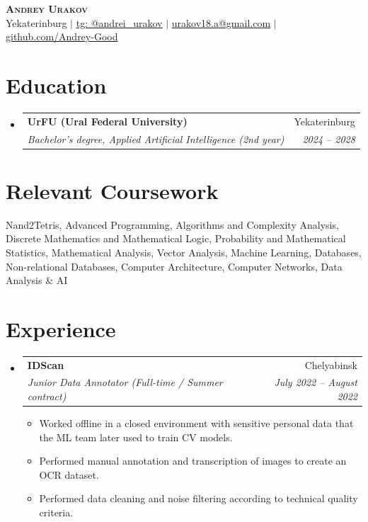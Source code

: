 \documentclass[letterpaper,10pt]{article}
\makeatletter
\newcommand{\resumeItem}[1]{
  \item\small{
    {#1 \vspace{-2pt}}
  }
}
\newcommand{\resumeSubheading}[4]{
  \vspace{-1pt}\item
    \begin{tabular*}{0.97\textwidth}[t]{l@{\extracolsep{\fill}}r}
      \textbf{#1} & #2 \\
      \textit{\small#3} & \textit{\small #4} \\
    \end{tabular*}\vspace{-7pt}
}
\newcommand{\resumeSubHeadingListStart}{\begin{itemize}[leftmargin=0.15in, label={}]}
\newcommand{\resumeSubHeadingListEnd}{\end{itemize}}
\newcommand{\resumeItemListStart}{\begin{itemize}[itemsep=0pt, parsep=0pt, topsep=1pt]}
\newcommand{\resumeItemListEnd}{\end{itemize}\vspace{-5pt}}
\makeatother
\begin{document}
\begin{center}
    \textbf{\Huge \scshape Andrey Urakov} \\ \vspace{1pt}
    \small{}Yekaterinburg $|$ \href{https://t.me/andrei\_urakov}{\underline{tg: @andrei\_urakov}} $|$ \href{mailto:urakov18.a@gmail.com}{\underline{urakov18.a@gmail.com}} $|$ \href{https://github.com/Andrey-Good}{\underline{github.com/Andrey-Good}}\end{center}

\section{Education}
  \resumeSubHeadingListStart
    \resumeSubheading
      {UrFU (Ural Federal University)}{Yekaterinburg}
      {Bachelor's degree, Applied Artificial Intelligence (2nd year)}{2024 -- 2028}
  \resumeSubHeadingListEnd

\section{Relevant Coursework}
 \begin{itemize}[leftmargin=0.15in, label={}]
    \small{\item{Nand2Tetris, Advanced Programming, Algorithms and Complexity Analysis, Discrete Mathematics and Mathematical Logic, Probability and Mathematical Statistics, Mathematical Analysis, Vector Analysis, Machine Learning, Databases, Non-relational Databases, Computer Architecture, Computer Networks, Data Analysis \& AI}}
 \end{itemize}

\section{Experience}
  \resumeSubHeadingListStart
    \resumeSubheading
      {IDScan}{Chelyabinsk}
      {Junior Data Annotator (Full-time / Summer contract)}{July 2022 -- August 2022}
      \resumeItemListStart
        \resumeItem{Worked offline in a closed environment with sensitive personal data that the ML team later used to train CV models.}
        \resumeItem{Performed manual annotation and transcription of images to create an OCR dataset.}
        \resumeItem{Performed data cleaning and noise filtering according to technical quality criteria.}
      \resumeItemListEnd
  \resumeSubHeadingListEnd
\end{document}

